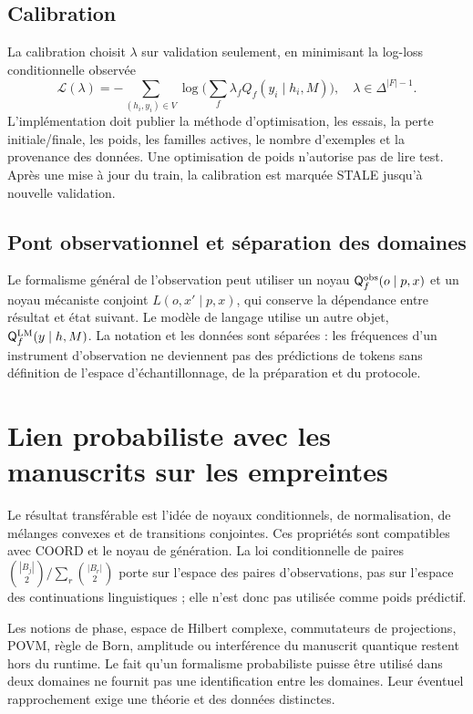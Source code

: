 \documentclass[11pt,a4paper,oneside,openany]{book}
\begin{document}
\section{Calibration}
La calibration choisit $\lambda$ sur validation seulement, en minimisant la log-loss conditionnelle observée
\[
 \mathcal L(\lambda)=-\sum_{(h_i,y_i)\in V}\log\bigl(\sum_f\lambda_f Q_f(y_i\mid h_i,M)\bigr),
 \quad \lambda\in\Delta^{|F|-1}.
\]
L'implémentation doit publier la méthode d'optimisation, les essais, la perte initiale/finale, les poids, les familles actives, le nombre d'exemples et la provenance des données. Une optimisation de poids n'autorise pas de lire test. Après une mise à jour du train, la calibration est marquée STALE jusqu'à nouvelle validation.

\section{Pont observationnel et séparation des domaines}
Le formalisme général de l'observation peut utiliser un noyau $\mathsf Q_f^{\mathrm{obs}}(o\mid p,x)$ et un noyau mécaniste conjoint $L(o,x'\mid p,x)$, qui conserve la dépendance entre résultat et état suivant. Le modèle de langage utilise un autre objet, $\mathsf Q_f^{\mathrm{LM}}(y\mid h,M)$. La notation et les données sont séparées : les fréquences d'un instrument d'observation ne deviennent pas des prédictions de tokens sans définition de l'espace d'échantillonnage, de la préparation et du protocole.

\chapter{Lien probabiliste avec les manuscrits sur les empreintes}
Le résultat transférable est l'idée de noyaux conditionnels, de normalisation, de mélanges convexes et de transitions conjointes. Ces propriétés sont compatibles avec COORD et le noyau de génération. La loi conditionnelle de paires $\binom{|B_j|}{2}/\sum_r\binom{|B_r|}{2}$ porte sur l'espace des paires d'observations, pas sur l'espace des continuations linguistiques ; elle n'est donc pas utilisée comme poids prédictif.

Les notions de phase, espace de Hilbert complexe, commutateurs de projections, POVM, règle de Born, amplitude ou interférence du manuscrit quantique restent hors du runtime. Le fait qu'un formalisme probabiliste puisse être utilisé dans deux domaines ne fournit pas une identification entre les domaines. Leur éventuel rapprochement exige une théorie et des données distinctes.
\end{document}
